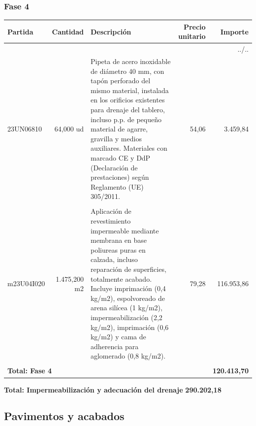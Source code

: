 \documentclass{book}%
\begin{document}
\normalsize

%
\subsubsection{Fase 4}%
\small%
\begin{longtable}{lrlrr}%
Partida&Cantidad&Descripción&\multicolumn{1}{p{1.5cm}}{Precio unitario}&Importe\\%
\hline%
\endhead%
\multicolumn{5}{r}{../..}\\%
\endfoot%
\hline%
\endlastfoot%
23UN06810&    64,000 ud&\multicolumn{1}{p{5cm}}{Pipeta de acero inoxidable de diámetro 40 mm, con tapón perforado del mismo material, instalada en los orificios existentes para drenaje del tablero, incluso p.p. de pequeño material de agarre, gravilla y medios auxiliares. Materiales con marcado CE y DdP (Declaración de prestaciones) según Reglamento (UE) 305/2011.}&     54,06&3.459,84\\%
&&&&\\%
m23U04I020& 1.475,200 m2&\multicolumn{1}{p{5cm}}{Aplicación de revestimiento impermeable mediante membrana en base poliureas puras en calzada, incluso reparación de superficies, totalmente acabado. Incluye imprimación (0,4 kg/m2), espolvoreado de arena silícea (1 kg/m2), impermeabilización (2,2 kg/m2), imprimación (0,6 kg/m2) y cama de adherencia para aglomerado (0,8 kg/m2).}&     79,28&116.953,86\\%
&&&&\\%
\multicolumn{4}{p{8cm}}{\textbf{Total: Fase 4}}&\textbf{120.413,70}\\%
\end{longtable}%
\normalsize

%
\noindent%
\large%
\textbf{Total: Impermeabilización y adecuación del drenaje }%
\dotfill%
\textbf{290.202,18}%
\newline%
\normalsize

%
\subsection{Pavimentos y acabados}%
\end{document}
